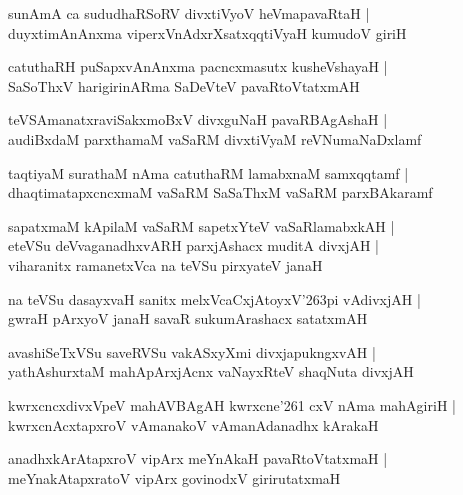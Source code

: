 \documentclass[twoside,12pt,openright]{book}
\def\S{\char'263}
\newcounter{shloka}[chapter]
\begin{document}
\begin{shloka}
sunAmA ca sududhaRSoRV divxtiVyoV heVmapavaRtaH |\\
duyxtimAnAnxma viperxVnAdxrXsatxqqtiVyaH kumudoV giriH 
\end{shloka}

\begin{shloka}
catuthaRH puSapxvAnAnxma pacncxmasutx kusheVshayaH |\\
SaSoThxV harigirinARma SaDeVteV pavaRtoVtatxmAH 
\end{shloka}

\begin{shloka}
teVSAmanatxraviSakxmoBxV divxguNaH pavaRBAgAshaH |\\
audiBxdaM parxthamaM vaSaRM divxtiVyaM reVNumaNaDxlamf
\end{shloka}

\begin{shloka}
taqtiyaM surathaM nAma catuthaRM lamabxnaM samxqqtamf |\\
dhaqtimatapxcncxmaM vaSaRM SaSaThxM vaSaRM parxBAkaramf 
\end{shloka}

\begin{shloka}
sapatxmaM kApilaM vaSaRM sapetxYteV vaSaRlamabxkAH |\\
eteVSu deVvaganadhxvARH parxjAshacx muditA divxjAH |\\
viharanitx ramanetxVca na teVSu pirxyateV janaH 
\end{shloka}

\begin{shloka}
na teVSu dasayxvaH sanitx melxVcaCxjAtoyxV\S pi vAdivxjAH |\\
gwraH pArxyoV janaH savaR sukumArashacx satatxmAH 
\end{shloka}

\begin{shloka}
avashiSeTxVSu saveRVSu vakASxyXmi divxjapukngxvAH |\\
yathAshurxtaM mahApArxjAcnx vaNayxRteV shaqNuta divxjAH
\end{shloka}

\begin{shloka}
kwrxcncxdivxVpeV mahAVBAgAH kwrxcne\char'261 cxV nAma mahAgiriH |\\
kwrxcnAcxtapxroV vAmanakoV vAmanAdanadhx kArakaH
\end{shloka}

\begin{shloka}
anadhxkArAtapxroV vipArx meYnAkaH pavaRtoVtatxmaH |\\
meYnakAtapxratoV vipArx govinodxV girirutatxmaH
\end{shloka}
\end{document}
